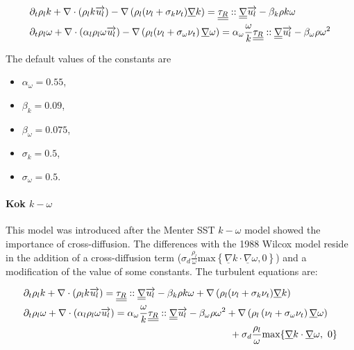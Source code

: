\begin{align}
		&\partial_t \rho_l k + \nabla \cdot ( \rho_l k \overrightarrow{u_l}) -  
		\nabla\left(  \rho_l(\nu_l + \sigma_k \nu_t) \underline{\nabla} k \right) =
		  \underline{\underline{\tau_R}}::\underline{\underline{\nabla}}\overrightarrow{u_l} 
		 - \beta_{k}\rho k \omega 
		\\
		&\partial_t  \rho_l \omega + \nabla \cdot \left( \alpha_l \rho_l \omega \overrightarrow{u_l} \right) - \nabla\left( \rho_l(\nu_l + \sigma_{\omega} \nu_t \right) \underline{\nabla} \omega) =
		 \alpha_{\omega}  \frac{\omega}{k}\underline{\underline{\tau_R}}::\underline{\underline{\nabla}}\overrightarrow{u_l} 
		 - \beta_{\omega}\rho \omega^2 
\end{align}

The default values of the constants are 
\begin{itemize}
    \item $\alpha_{\omega} = 0.55$,
    \item $\beta_{k} = 0.09$,
    \item $\beta_{\omega} = 0.075$,
    \item $\sigma_k = 0.5$,
    \item $\sigma_{\omega} = 0.5$.
\end{itemize}

\paragraph{Kok $k-\omega$}\mbox{}

This model \cite{Kok1999} was introduced after the Menter SST $k-\omega$ model \cite{Menter1993, Menter2003} showed the importance of cross-diffusion. The differences with the 1988 Wilcox model reside in the addition of a cross-diffusion term (${ \sigma_d\frac{  \rho_l}{\omega} } \text{max}\left\{{\underline{\nabla}k \cdot \underline{\nabla} \omega}, 0\right\}  $) and a modification of the value of some constants. The turbulent equations are:

\begin{align}
	\label{eq_omega_Kok}
		&\partial_t \rho_l k + \nabla \cdot \parent{\rho_l k \vec{u_l}} =  
		\underline{\underline{\tau_R}}::\underline{\underline{\nabla}}\vec{u_l}
		 - \beta_{k}\rho k \omega 
		+ \nabla\parent{\rho_l(\nu_l + \sigma_k \nu_t) \underline{\nabla} k}
		\\
		&\begin{multlined}
		\partial_t  \rho_l \omega + \nabla \cdot \parent{\alpha_l \rho_l \omega \vec{u_l}} =
		 \alpha_{\omega} \frac{\omega}{k}\underline{\underline{\tau_R}}::\underline{\underline{\nabla}}\vec{u_l} 
		 - \beta_{\omega}\rho \omega^2 
		 +\nabla\parent{\rho_l\parent{\nu_l + \sigma_{\omega}\nu_t} \underline{\nabla} \omega} \\
		 + \sigma_d\frac{\rho_l}{\omega} \text{max}\acco{\underline{\nabla}k \cdot \underline{\nabla} \omega,\ 0}
		\end{multlined}
\end{align}

